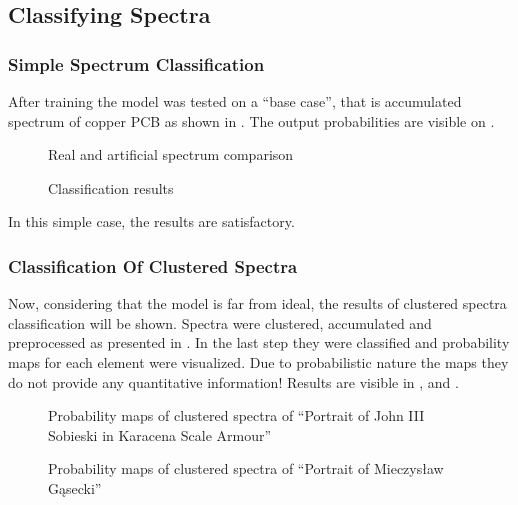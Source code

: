 \subsection{Classifying Spectra}
\subsubsection{Simple Spectrum Classification}
After training the model was tested on a ``base case'', that is accumulated spectrum of copper PCB as shown in .
The output probabilities are visible on .

\begin{figure}[H]
  \centering
  
  \caption{Real and artificial spectrum comparison}
  \label{fig:spectra-comparison}
\end{figure}


\begin{figure}[H]
  \centering
  
  \caption{Classification results}
  \label{fig:copper-pcb-classification}
\end{figure}

In this simple case, the results are satisfactory.

\subsubsection{Classification Of Clustered Spectra}
Now, considering that the model is far from ideal, the results of clustered spectra classification will be shown. 
Spectra were clustered, accumulated and preprocessed as presented in .
In the last step they were classified and probability maps for each element were visualized.
Due to probabilistic nature the maps they do not provide any quantitative information! 
Results are visible in ,  and .

\begin{figure}[htbp!]
  \centering
  
  \caption{Probability maps of clustered spectra of ``Portrait of John III Sobieski in Karacena Scale Armour''}
  \label{fig:clusters-prob-sobieski}
\end{figure}

\begin{figure}[htbp!]
  \centering
  
  \caption{Probability maps of clustered spectra of ``Portrait of Mieczysław Gąsecki''}
  \label{fig:clusters-prob-gasecki}
\end{figure}

